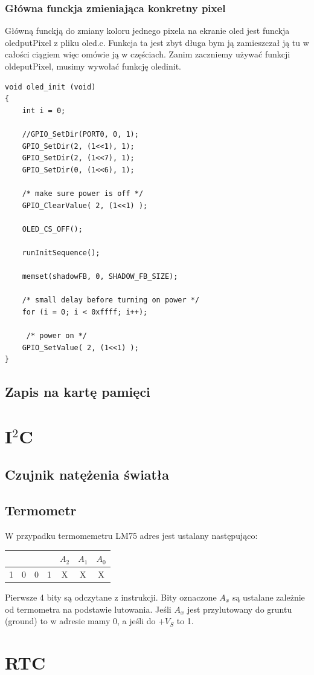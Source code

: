 \documentclass[11pt]{article}
\begin{document}
\subsubsection{Główna funckja zmieniająca konkretny pixel}
Główną funckją do zmiany koloru jednego pixela na ekranie oled jest funckja oled\textunderscore putPixel
z pliku oled.c. Funkcja ta jest zbyt długa bym ją zamieszczał ją tu w całości ciągiem więc omówie ją
w częściach. Zanim zaczniemy używać funkcji olde\textunderscore putPixel, musimy wywołać funkcję
oled\textunderscore init.
\begin{lstlisting}
void oled_init (void)
{
    int i = 0;

    //GPIO_SetDir(PORT0, 0, 1);
    GPIO_SetDir(2, (1<<1), 1);
    GPIO_SetDir(2, (1<<7), 1);
    GPIO_SetDir(0, (1<<6), 1);

    /* make sure power is off */
    GPIO_ClearValue( 2, (1<<1) );

    OLED_CS_OFF();

    runInitSequence();

    memset(shadowFB, 0, SHADOW_FB_SIZE);

    /* small delay before turning on power */
    for (i = 0; i < 0xffff; i++);

     /* power on */
    GPIO_SetValue( 2, (1<<1) );
}
\end{lstlisting}

\subsection{Zapis na kartę pamięci}

\section{I$^2$C}
\subsection{Czujnik natężenia światła}
\subsection{Termometr}
W przypadku termomemetru LM75 adres jest ustalany następująco:
\begin{center}
    \begin{tabular}{|c|c|c|c|c|c|c|}
        \hline
         & & & & $A_2$ & $A_1$ & $A_0$\\
        \hline
        1& 0& 0& 1& X & X & X\\
        \hline
    \end{tabular}
\end{center}
Pierwsze 4 bity są odczytane z instrukcji. Bity oznaczone $A_x$ są ustalane
zależnie od termometra na podstawie lutowania. Jeśli $A_x$ jest przylutowany
do gruntu (ground) to w adresie mamy 0, a jeśli do $+V_S$ to 1.
\section{RTC}
\end{document}
